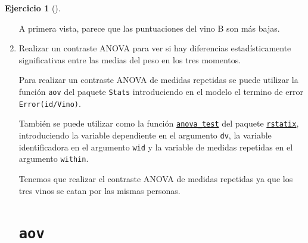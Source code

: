 \documentclass[
  a4paper,
]{scrreport}
\theoremstyle{definition}
\newtheorem{exercise}{Ejercicio}[chapter]
\theoremstyle{remark}
\begin{document}
\begin{exercise}[]
\begin{enumerate}
\begin{tcolorbox}
  A primera vista, parece que las puntuaciones del vino B son más bajas.

  \end{tcolorbox}
\item
  Realizar un contraste ANOVA para ver si hay diferencias
  estadísticamente significativas entre las medias del peso en los tres
  momentos.

  \begin{tcolorbox}[enhanced jigsaw, breakable, toptitle=1mm, colbacktitle=quarto-callout-note-color!10!white, rightrule=.15mm, opacityback=0, opacitybacktitle=0.6, titlerule=0mm, coltitle=black, colframe=quarto-callout-note-color-frame, colback=white, bottomtitle=1mm, leftrule=.75mm, toprule=.15mm, title=\textcolor{quarto-callout-note-color}{\faInfo}\hspace{0.5em}{Ayuda}, arc=.35mm, bottomrule=.15mm, left=2mm]

  Para realizar un contraste ANOVA de medidas repetidas se puede
  utilizar la función \texttt{aov} del paquete \texttt{Stats}
  introduciendo en el modelo el termino de error
  \texttt{Error(id/Vino)}.

  También se puede utilizar como la función
  \href{https://rpkgs.datanovia.com/rstatix/reference/anova_test.html}{\texttt{anova\_test}}
  del paquete
  \href{https://rpkgs.datanovia.com/rstatix/index.html}{\texttt{rstatix}},
  introduciendo la variable dependiente en el argumento \texttt{dv}, la
  variable identificadora en el argumento \texttt{wid} y la variable de
  medidas repetidas en el argumento \texttt{within}.

  \end{tcolorbox}

  \begin{tcolorbox}[enhanced jigsaw, breakable, toptitle=1mm, colbacktitle=quarto-callout-tip-color!10!white, rightrule=.15mm, opacityback=0, opacitybacktitle=0.6, titlerule=0mm, coltitle=black, colframe=quarto-callout-tip-color-frame, colback=white, bottomtitle=1mm, leftrule=.75mm, toprule=.15mm, title=\textcolor{quarto-callout-tip-color}{\faLightbulb}\hspace{0.5em}{Solución}, arc=.35mm, bottomrule=.15mm, left=2mm]

  Tenemos que realizar el contraste ANOVA de medidas repetidas ya que
  los tres vinos se catan por las mismas personas.

  \section{\texorpdfstring{\texttt{aov}}{aov}}


\end{tcolorbox}
\end{enumerate}
\end{exercise}
\end{document}
